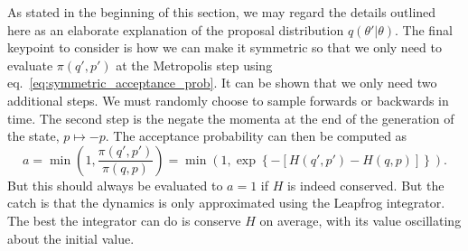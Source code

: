 As stated in the beginning of this section, we may regard the details outlined here as an elaborate explanation of the proposal distribution $q(\theta'|\theta)$. The final keypoint to consider is how we can make it symmetric so
that we only need to evaluate $\pi(q', p')$ at the Metropolis step using eq.~\eqref{eq:symmetric_acceptance_prob}. It can be shown that we only need two additional steps. We must randomly choose to sample forwards or backwards in time. The second step is the negate the momenta at the end of the generation of the state, $p \mapsto -p$. The acceptance probability can then be computed as
\begin{equation}\label{eq:hmc_acceptance}
  a = \min \left(1, \frac{\pi(q', p')}{\pi(q, p)}\right) = \min \left(1, \exp\left\{-\left[H(q',p') - H(q, p)\right]\right\}\right).
\end{equation}
But this should always be evaluated to $a = 1$ if $H$ is indeed conserved. But the catch is that the dynamics is only approximated using the Leapfrog integrator. The best the integrator can do is conserve $H$ on average, with its value oscillating about the initial value.

